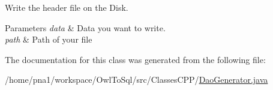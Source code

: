 Write the header file on the Disk. 


\begin{DoxyParams}{Parameters}
{\em data} & Data you want to write. \\
\hline
{\em path} & Path of your file \\
\hline
\end{DoxyParams}


The documentation for this class was generated from the following file:\begin{DoxyCompactItemize}
\item 
/home/pna1/workspace/OwlToSql/src/ClassesCPP/\hyperlink{_dao_generator_8java}{DaoGenerator.java}\end{DoxyCompactItemize}

